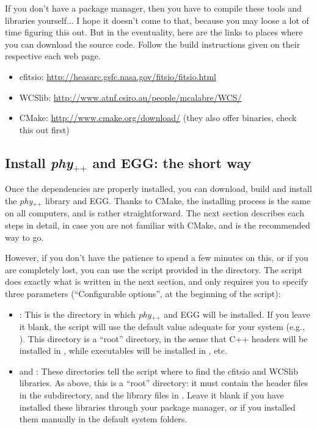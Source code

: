 \documentclass[12pt,a4paper]{article}
\newcommand{\phypp}{\textit{phy}$_{\text{++}}$\xspace}
\newcommand{\egg}{\textsc{EGG}\xspace}
\begin{document}
If you don't have a package manager, then you have to compile these tools and libraries yourself... I hope it doesn't come to that, because you may loose a lot of time figuring this out. But in the eventuality, here are the links to places where you can download the source code. Follow the build instructions given on their respective each web page.
\begin{itemize}
\item cfitsio: \url{http://heasarc.gsfc.nasa.gov/fitsio/fitsio.html}
\item WCSlib: \url{http://www.atnf.csiro.au/people/mcalabre/WCS/}
\item CMake: \url{http://www.cmake.org/download/} (they also offer binaries, check this out first)
\end{itemize}

\subsection{Install \phypp and \egg: the short way}

Once the dependencies are properly installed, you can download, build and install the \phypp library and \egg. Thanks to CMake, the installing process is the same on all computers, and is rather straightforward. The next section describes each steps in detail, in case you are not familiar with CMake, and is the recommended way to go.

However, if you don't have the patience to spend a few minutes on this, or if you are completely lost, you can use the  script provided in the  directory. The script does exactly what is written in the next section, and only requires you to specify three parameters (``Configurable options'', at the beginning of the script):
\begin{itemize}
\item {}: This is the directory in which \phypp and \egg will be installed. If you leave it blank, the script will use the default value adequate for your system (e.g., ). This directory is a ``root'' directory, in the sense that C++ headers will be installed in , while executables will be installed in , etc.
\item {} and : These directories tell the script where to find the cfitsio and WCSlib libraries. As above, this is a ``root'' directory: it must contain the header files in the  subdirectory, and the library files in . Leave it blank if you have installed these libraries through your package manager, or if you installed them manually in the default system folders.
\end{itemize}
\end{document}
